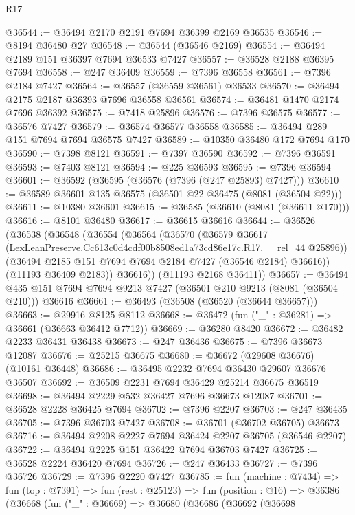 \begin{lexlean}{R17}
\begin{coremodule}
@36544 := @36494 @2170 @2191 @7694 @36399 @2169 @36535
@36546 := @8194 @36480 @27
@36548 := @36544 (@36546 @2169)
@36554 := @36494 @2189 @151 @36397 @7694 @36533 @7427
@36557 := @36528 @2188 @36395 @7694
@36558 := @247 @36409
@36559 := @7396 @36558
@36561 := @7396 @2184 @7427
@36564 := @36557 (@36559 @36561) @36533
@36570 := @36494 @2175 @2187 @36393 @7696 @36558 @36561
@36574 := @36481 @1470 @2174 @7696 @36392
@36575 := @7418 @25896
@36576 := @7396 @36575
@36577 := @36576 @7427
@36579 := @36574 @36577 @36558
@36585 := @36494 @289 @151 @7694 @7694 @36575 @7427
@36589 := @10350 @36480 @172 @7694 @170
@36590 := @7398 @8121
@36591 := @7397 @36590
@36592 := @7396 @36591
@36593 := @7403 @8121
@36594 := @225 @36593
@36595 := @7396 @36594
@36601 := @36592 (@36595 (@36576 (@7396 (@247 @25893) @7427)))
@36610 := @36589 @36601 @135 @36575 (@36501 @22 @36475 (@8081 (@36504 @22)))
@36611 := @10380 @36601
@36615 := @36585 (@36610 (@8081 (@36611 @170)))
@36616 := @8101 @36480
@36617 := @36615 @36616
@36644 := @36526
    (@36538
      (@36548
        (@36554
          (@36564
            (@36570
              (@36579
                @36617
                (LexLeanPreserve.Cc613c0d4cdf00b8508ed1a73cd86e17c.R17.__rel_44 @25896))
              (@36494 @2185 @151 @7694 @7694 @2184 @7427 (@36546 @2184) @36616))
            (@11193 @36409 @2183))
          @36616))
      (@11193 @2168 @36411))
@36657 := @36494 @435 @151 @7694 @7694 @9213 @7427 (@36501 @210 @9213 (@8081 (@36504 @210))) @36616
@36661 := @36493 (@36508 (@36520 (@36644 @36657)))
@36663 := @29916 @8125 @8112
@36668 := @36472 (fun ("_" : @36281) => @36661 (@36663 @36412 @7712))
@36669 := @36280 @8420
@36672 := @36482 @2233 @36431 @36438
@36673 := @247 @36436
@36675 := @7396 @36673 @12087
@36676 := @25215 @36675
@36680 := @36672 (@29608 @36676) (@10161 @36448)
@36686 := @36495 @2232 @7694 @36430 @29607 @36676 @36507
@36692 := @36509 @2231 @7694 @36429 @25214 @36675 @36519
@36698 := @36494 @2229 @532 @36427 @7696 @36673 @12087
@36701 := @36528 @2228 @36425 @7694
@36702 := @7396 @2207
@36703 := @247 @36435
@36705 := @7396 @36703 @7427
@36708 := @36701 (@36702 @36705) @36673
@36716 := @36494 @2208 @2227 @7694 @36424 @2207 @36705 (@36546 @2207)
@36722 := @36494 @2225 @151 @36422 @7694 @36703 @7427
@36725 := @36528 @2224 @36420 @7694
@36726 := @247 @36433
@36727 := @7396 @36726
@36729 := @7396 @2220 @7427
@36785 := fun (machine : @7434) =>
  fun (top : @7391) =>
  fun (rest : @25123) =>
  fun (position : @16) =>
  @36386
    (@36668
      (fun ("_" : @36669) =>
      @36680
        (@36686
          (@36692
            (@36698

\end{coremodule}
\end{lexlean}
